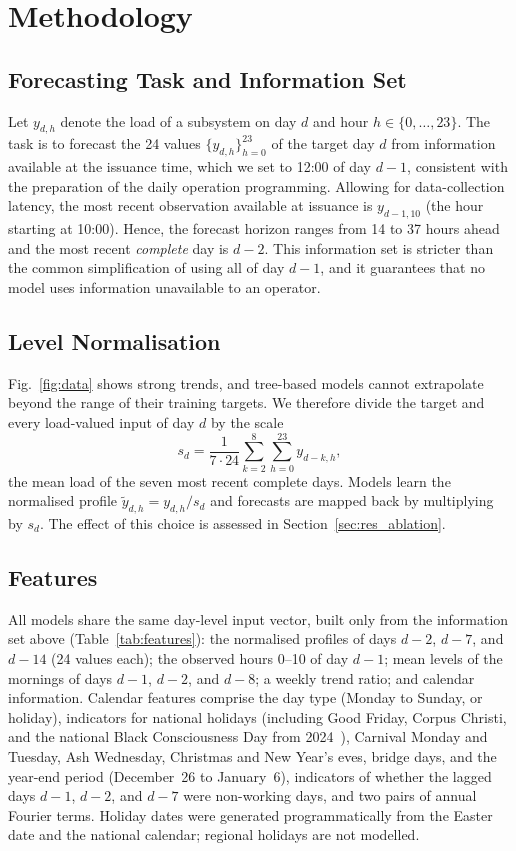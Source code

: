 \section{Methodology}
\label{sec:method}

\subsection{Forecasting Task and Information Set}
Let $y_{d,h}$ denote the load of a subsystem on day $d$ and hour $h\in\{0,\dots,23\}$. The task is to forecast the 24 values $\{y_{d,h}\}_{h=0}^{23}$ of the target day $d$ from information available at the issuance time, which we set to 12:00 of day $d-1$, consistent with the preparation of the daily operation programming. Allowing for data-collection latency, the most recent observation available at issuance is $y_{d-1,10}$ (the hour starting at 10:00). Hence, the forecast horizon ranges from 14 to 37 hours ahead and the most recent \emph{complete} day is $d-2$. This information set is stricter than the common simplification of using all of day $d-1$, and it guarantees that no model uses information unavailable to an operator.

\subsection{Level Normalisation}
Fig.~\ref{fig:data} shows strong trends, and tree-based models cannot extrapolate beyond the range of their training targets. We therefore divide the target and every load-valued input of day $d$ by the scale
\begin{equation}
s_d=\frac{1}{7\cdot 24}\sum_{k=2}^{8}\sum_{h=0}^{23} y_{d-k,h},
\label{eq:scale}
\end{equation}
the mean load of the seven most recent complete days. Models learn the normalised profile $\tilde y_{d,h}=y_{d,h}/s_d$ and forecasts are mapped back by multiplying by $s_d$. The effect of this choice is assessed in Section~\ref{sec:res_ablation}.

\subsection{Features}
All models share the same day-level input vector, built only from the information set above (Table~\ref{tab:features}): the normalised profiles of days $d-2$, $d-7$, and $d-14$ (24 values each); the observed hours 0--10 of day $d-1$; mean levels of the mornings of days $d-1$, $d-2$, and $d-8$; a weekly trend ratio; and calendar information. Calendar features comprise the day type (Monday to Sunday, or holiday), indicators for national holidays (including Good Friday, Corpus Christi, and the national Black Consciousness Day from 2024~\cite{lei14759}), Carnival Monday and Tuesday, Ash Wednesday, Christmas and New Year's eves, bridge days, and the year-end period (December~26 to January~6), indicators of whether the lagged days $d-1$, $d-2$, and $d-7$ were non-working days, and two pairs of annual Fourier terms. Holiday dates were generated programmatically from the Easter date and the national calendar; regional holidays are not modelled.

